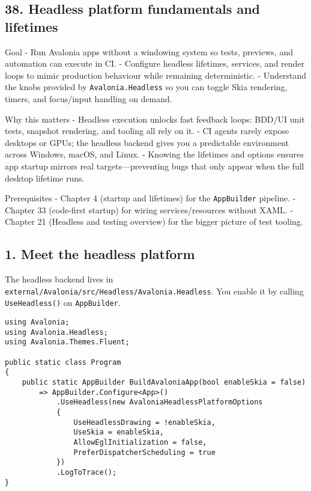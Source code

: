 \newpage

\subsection{38. Headless platform fundamentals and
lifetimes}\label{headless-platform-fundamentals-and-lifetimes}

Goal - Run Avalonia apps without a windowing system so tests, previews,
and automation can execute in CI. - Configure headless lifetimes,
services, and render loops to mimic production behaviour while remaining
deterministic. - Understand the knobs provided by
\passthrough{\lstinline!Avalonia.Headless!} so you can toggle Skia
rendering, timers, and focus/input handling on demand.

Why this matters - Headless execution unlocks fast feedback loops:
BDD/UI unit tests, snapshot rendering, and tooling all rely on it. - CI
agents rarely expose desktops or GPUs; the headless backend gives you a
predictable environment across Windows, macOS, and Linux. - Knowing the
lifetimes and options ensures app startup mirrors real
targets---preventing bugs that only appear when the full desktop
lifetime runs.

Prerequisites - Chapter 4 (startup and lifetimes) for the
\passthrough{\lstinline!AppBuilder!} pipeline. - Chapter 33 (code-first
startup) for wiring services/resources without XAML. - Chapter 21
(Headless and testing overview) for the bigger picture of test tooling.

\subsection{1. Meet the headless
platform}\label{meet-the-headless-platform}

The headless backend lives in
\passthrough{\lstinline!external/Avalonia/src/Headless/Avalonia.Headless!}.
You enable it by calling \passthrough{\lstinline!UseHeadless()!} on
\passthrough{\lstinline!AppBuilder!}.

\begin{lstlisting}
using Avalonia;
using Avalonia.Headless;
using Avalonia.Themes.Fluent;

public static class Program
{
    public static AppBuilder BuildAvaloniaApp(bool enableSkia = false)
        => AppBuilder.Configure<App>()
            .UseHeadless(new AvaloniaHeadlessPlatformOptions
            {
                UseHeadlessDrawing = !enableSkia,
                UseSkia = enableSkia,
                AllowEglInitialization = false,
                PreferDispatcherScheduling = true
            })
            .LogToTrace();
}
\end{lstlisting}

